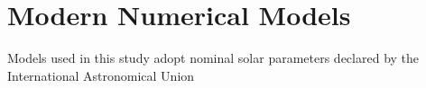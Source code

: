 \section{Modern Numerical Models}
Models used in this study adopt nominal solar parameters declared by the International Astronomical Union 